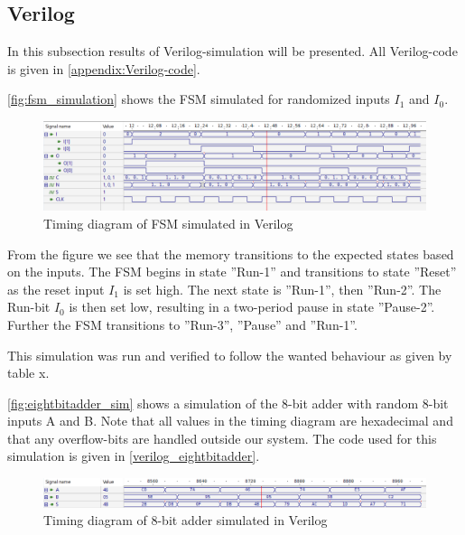 \subsection{Verilog}

In this subsection results of Verilog-simulation will be presented. All Verilog-code is given in \autoref{appendix:Verilog-code}.

\autoref{fig:fsm_simulation} shows the FSM simulated for randomized inputs $I_1$ and $I_0$.

\begin{figure}[H]
    \centering
    \includegraphics[width=\textwidth]{Figures/Test of FSM.png}
    \caption{Timing diagram of FSM simulated in Verilog}
    \label{fig:fsm_simulation}
\end{figure}

From the figure we see that the memory transitions to the expected states based on the inputs. The FSM begins in state ''Run-1'' and transitions to state ''Reset'' as the reset input $I_1$ is set high. The next state is ''Run-1'', then ''Run-2''. The Run-bit $I_0$ is then set low, resulting in a two-period pause in state ''Pause-2''. Further the FSM transitions to ''Run-3'', ''Pause'' and ''Run-1''.

This simulation was run and verified to follow the wanted behaviour as given by table x.

\autoref{fig:eightbitadder_sim} shows a simulation of the 8-bit adder with random 8-bit inputs A and B. Note that all values in the timing diagram are hexadecimal and that any overflow-bits are handled outside our system. The code used for this simulation is given in \autoref{verilog_eightbitadder}.

\begin{figure}[H]
    \centering
    \includegraphics[width=\textwidth]{Figures/Test of eightbitadder.png}
    \caption{Timing diagram of 8-bit adder simulated in Verilog}
    \label{fig:eightbitadder_sim}
\end{figure}


